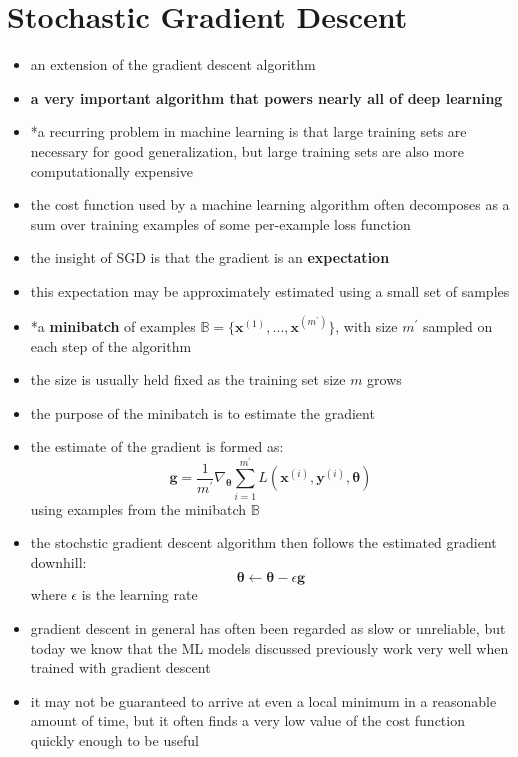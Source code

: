 \documentclass[11pt, twocolumn]{report}
\def\parameter{\bm{\theta}}
\begin{document}
\section{Stochastic Gradient Descent}
\begin{itemize}
  \item an extension of the gradient descent algorithm
  \item \textbf{a very important algorithm that powers nearly all of deep
      learning}
  \item *a recurring problem in machine learning is that large training sets
    are necessary for good generalization, but large training sets are also
    more computationally expensive
  \item the cost function used by a machine learning algorithm often decomposes
    as a sum over training examples of some per-example loss function
  \item the insight of SGD is that the gradient is an \textbf{expectation}
  \item this expectation may be approximately estimated using a small set of
    samples
  \item *a \textbf{minibatch} of examples $\mathbb{B} =
    \{\bm{x}^{(1)},...,\bm{x}^{(m^{'})}\}$, with size $m^{'}$ sampled on each
    step of the algorithm
  \item the size is usually held fixed as the training set size $m$ grows
  \item the purpose of the minibatch is to estimate the gradient
  \item the estimate of the gradient is formed as:
    \begin{equation}
      \bm{g} = \frac{1}{m^{'}} \nabla_{\parameter} \sum_{i=1}^{m^{'}}
      L(\bm{x}^{(i)}, \bm{y}^{(i)}, \parameter)
    \end{equation}
    using examples from the minibatch $\mathbb{B}$
  \item the stochstic gradient descent algorithm then follows the estimated
    gradient downhill:
    \begin{equation}
      \parameter \leftarrow \parameter - \epsilon \bm{g}
    \end{equation}
    where $\epsilon$ is the learning rate
  \item gradient descent in general has often been regarded as slow or
    unreliable, but today we know that the ML models discussed previously work
    very well when trained with gradient descent
  \item it may not be guaranteed to arrive at even a local minimum in a
    reasonable amount of time, but it often finds a very low value of the cost
    function quickly enough to be useful
\end{itemize}
\end{document}

